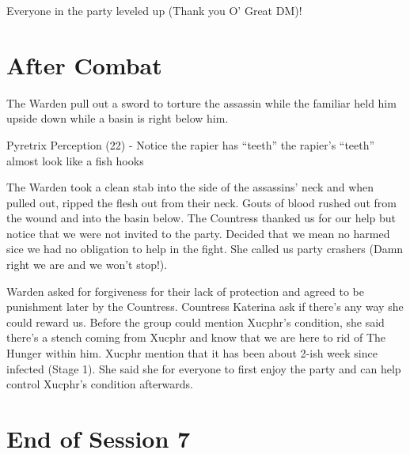 Everyone in the party leveled up (Thank you O' Great DM)!

\section{After Combat}
	The Warden pull out a sword to torture the assassin while the familiar held him upside down while a basin is right below him. 

\begin{DndComment}{Pyretrix}
Perception (22) - Notice the rapier has “teeth” the rapier’s “teeth” almost look like a fish hooks
\end{DndComment}

The Warden took a clean stab into the side of the assassins' neck and when pulled out, ripped the flesh out from their neck. Gouts of blood rushed out from the wound and into the basin below. The Countress thanked us for our help but notice that we were not invited to the party. Decided that we mean no harmed sice we had no obligation to help in the
fight. She called us party crashers (Damn right we are and we won't stop!). 

	Warden asked for forgiveness for their lack of protection and agreed to be punishment later by the Countress. Countress Katerina ask if there’s any way she could reward us. Before the group could mention Xucphr's condition, she said there's a stench coming from Xucphr and know that we are here to rid of The Hunger within him. Xucphr mention that it has been about 2-ish week since infected (Stage 1). She said she for everyone to first enjoy the party and can help control Xucphr's condition afterwards.
	
\section{End of Session 7}
